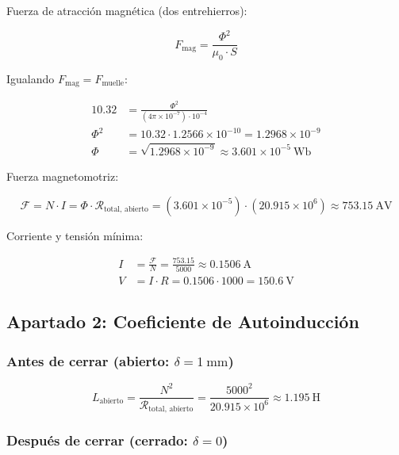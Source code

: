 \documentclass[12pt,a4paper]{article}
\begin{document}
Fuerza de atracción magnética (dos entrehierros):

\begin{equation}
    F_{\text{mag}} = \frac{\Phi^2}{\mu_0 \cdot S}
\end{equation}

Igualando $F_{\text{mag}} = F_{\text{muelle}}$:

\begin{align}
    10.32 &= \frac{\Phi^2}{(4\pi \times 10^{-7}) \cdot 10^{-4}} \nonumber \\
    \Phi^2 &= 10.32 \cdot 1.2566 \times 10^{-10} = 1.2968 \times 10^{-9} \nonumber \\
    \Phi &= \sqrt{1.2968 \times 10^{-9}} \approx 3.601 \times 10^{-5}\ \si{\weber}
\end{align}

Fuerza magnetomotriz:

\begin{equation}
    \mathcal{F} = N \cdot I = \Phi \cdot \mathcal{R}_{\text{total, abierto}}
    = (3.601 \times 10^{-5}) \cdot (20.915 \times 10^{6})
    \approx \SI{753.15}{\ampere\volt}
\end{equation}

Corriente y tensión mínima:

\begin{align}
    I &= \frac{\mathcal{F}}{N} = \frac{753.15}{5000} \approx \SI{0.1506}{\ampere} \\
    V &= I \cdot R = 0.1506 \cdot 1000 = \SI{150.6}{\volt}
\end{align}

\subsection{Apartado 2: Coeficiente de Autoinducción}

\subsubsection*{Antes de cerrar (abierto: $\delta = \SI{1}{\mm}$)}

\begin{equation}
    L_{\text{abierto}} = \frac{N^2}{\mathcal{R}_{\text{total, abierto}}}
    = \frac{5000^2}{20.915 \times 10^{6}}
    \approx \SI{1.195}{\henry}
\end{equation}

\subsubsection*{Después de cerrar (cerrado: $\delta = 0$)}
\end{document}
